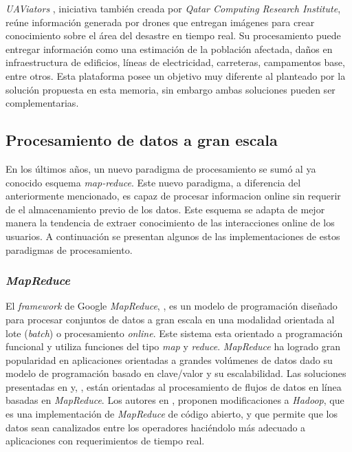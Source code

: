\textit{UAViators} \cite{UAViators}, iniciativa también creada por \textit{Qatar Computing Research Institute}, reúne información generada por drones que entregan imágenes para crear conocimiento sobre el área del desastre en tiempo real. Su procesamiento puede entregar información como una estimación de la población afectada, daños en infraestructura de edificios, líneas de electricidad, carreteras, campamentos base, entre otros. Esta plataforma posee un objetivo muy diferente al planteado por la solución propuesta en esta memoria, sin embargo ambas soluciones pueden ser complementarias.

\subsection{Procesamiento de datos a gran escala}
\label{arte:SPS}

En los últimos años, un nuevo paradigma de procesamiento se sumó al ya conocido esquema \textit{map-reduce}. Este nuevo paradigma, a diferencia del anteriormente mencionado, es capaz de procesar informacion online sin requerir de el almacenamiento previo de los datos. Este esquema se adapta de mejor manera la tendencia de extraer conocimiento de las interacciones online de los usuarios. A continuación se presentan algunos de las implementaciones de estos paradigmas de procesamiento.

\subsubsection*{\textit{MapReduce}}
\label{arte:SPS:mapreduce}

El \textit{framework} de Google \textit{MapReduce}, \cite{DeanMapReduce}, es un modelo de programación diseñado para procesar conjuntos de datos a gran escala en una modalidad orientada al lote (\textit{batch}) o procesamiento \textit{online}. Este sistema esta orientado a programación funcional y utiliza funciones del tipo \textit{map} y \textit{reduce}. \textit{MapReduce} ha logrado gran popularidad en aplicaciones orientadas a grandes volúmenes de datos dado su modelo de programación basado en clave/valor y su escalabilidad. Las soluciones presentadas en  y, \cite{VermaMapReduce}, están orientadas al procesamiento de flujos de datos en línea basadas en \textit{MapReduce}. Los autores en \cite{CondieMapReduce}, proponen modificaciones a \textit{Hadoop}, que es una implementación de \textit{MapReduce} de código abierto, y que permite que los datos sean canalizados entre los operadores haciéndolo más adecuado a aplicaciones con requerimientos de tiempo real. 


